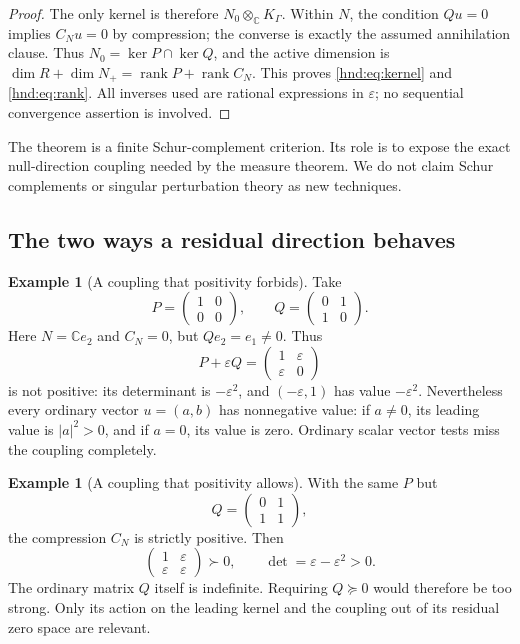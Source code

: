 \documentclass[11pt,oneside]{article}
\theoremstyle{definition}
\newtheorem{example}[theorem]{Example}
\theoremstyle{remark}
\newcommand{\C}{\mathbb C}
\newcommand{\rank}{\operatorname{rank}}
\newcommand{\eps}{\varepsilon}
\begin{document}
\begin{proof}
The only kernel is therefore $N_0\otimes_\C K_\Gamma$.
Within $N$, the condition $Qu=0$ implies $C_Nu=0$ by compression;
the converse is exactly the assumed annihilation clause. Thus
$N_0=\ker P\cap\ker Q$, and the active dimension is
$\dim R+\dim N_+=\rank P+\rank C_N$. This proves \eqref{hnd:eq:kernel} and
\eqref{hnd:eq:rank}. All inverses used are rational expressions in $\eps$;
no sequential convergence assertion is involved.
\end{proof}

The theorem is a finite Schur-complement criterion. Its role is to
expose the exact null-direction coupling needed by the measure theorem.
We do not claim Schur complements or singular perturbation theory as
new techniques.

\subsection{The two ways a residual direction behaves}

\begin{example}[A coupling that positivity forbids]\label{hnd:ex:badcoupling}
Take
\[
 P=\begin{pmatrix}1&0\\0&0\end{pmatrix},\qquad
 Q=\begin{pmatrix}0&1\\1&0\end{pmatrix}.
\]
Here $N=\C e_2$ and $C_N=0$, but $Qe_2=e_1\ne0$.
Thus
\[
 P+\eps Q=\begin{pmatrix}1&\eps\\\eps&0\end{pmatrix}
\]
is not positive: its determinant is $-\eps^2$, and $(-\eps,1)$ has
value $-\eps^2$.
Nevertheless every ordinary vector $u=(a,b)$ has nonnegative value:
if $a\ne0$, its leading value is $|a|^2>0$, and if $a=0$, its value is
zero. Ordinary scalar vector tests miss the coupling completely.
\end{example}

\begin{example}[A coupling that positivity allows]\label{hnd:ex:goodcoupling}
With the same $P$ but
\[
 Q=\begin{pmatrix}0&1\\1&1\end{pmatrix},
\]
the compression $C_N$ is strictly positive. Then
\[
 \begin{pmatrix}1&\eps\\\eps&\eps\end{pmatrix}\succ0,
 \qquad \det=\eps-\eps^2>0.
\]
The ordinary matrix $Q$ itself is indefinite. Requiring $Q\succeq0$
would therefore be too strong. Only its action on the leading kernel
and the coupling out of its residual zero space are relevant.
\end{example}
\end{document}
